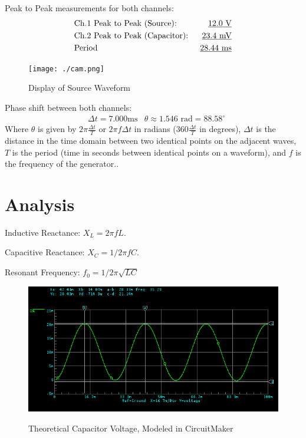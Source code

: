 \documentclass[twocolumn,english]{IEEEtran}
\theoremstyle{plain}
\theoremstyle{plain}
\begin{document}
\noindent Peak to Peak measurements for both channels:
\begin{align*}
 &\text{Ch.1 Peak to Peak (Source): }		&\text{\underline{$12.0$ V}}	\\
 &\text{Ch.2 Peak to Peak (Capacitor): }	&\text{\underline{$23.4$ mV}}	\\
 &\text{Period}		&\text{\underline{28.44 ms}}
\end{align*}

\begin{figure}[h!]
  \begin{centering}
  \begin{center}
  \texttt{[image: ./cam.png]}
  \label{fig:source_voltage}
  \caption{Display of Source Waveform}
  \end{center}
  \par\end{centering}
  \end{figure}

\noindent Phase shift between both channels:
\begin{align*}
 &\Delta t = 7.000\text{ms}	&\theta \approx 1.546\text{ rad} = 88.58^{\circ}
\end{align*}
Where $\theta$ is given by  $2\pi\frac{\Delta t}{T}$ or $2\pi f \Delta t$ in radians ($360\frac{\Delta t}{T}$ in degrees), $\Delta t$ is the distance in the time domain between two identical points on the adjacent waves, $T$ is the period (time in seconds between identical points on a waveform), and $f$ is the frequency of the generator..

\section{Analysis}
Inductive Reactance: $X_L = 2\pi f L$.

Capacitive Reactance: $X_C = 1/2\pi f C$.

Resonant Frequency: $f_0 = 1/2\pi\sqrt{LC}$

\begin{figure}[h!]
  \begin{centering}
  \begin{center}
  \includegraphics[width=\linewidth]{./waveform.png}
  \label{fig:theory_wave}
  \caption{Theoretical Capacitor Voltage, Modeled in CircuitMaker}
  \end{center}
  \par\end{centering}
  \end{figure}
\end{document}
